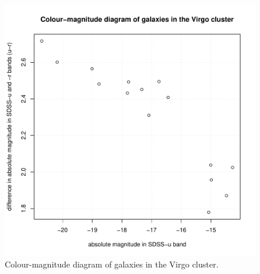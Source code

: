 \documentclass[11pt,a4paper,twoside]{article}
\begin{document}
\begin{figure}[!ht]
\centering
\includegraphics[width=1\linewidth]{cmd_Virgo.pdf}
\caption{Colour-magnitude diagram of galaxies in the Virgo cluster.}
\label{fig:cmd_Virgo}
\end{figure}
\end{document}
